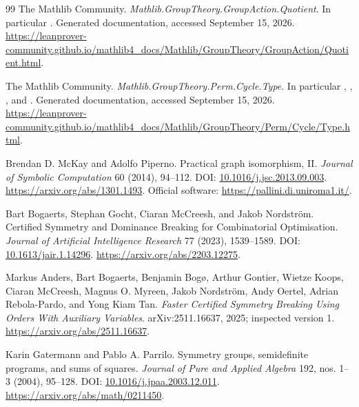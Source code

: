 \begin{thebibliography}{99}
The Mathlib Community.
\emph{Mathlib.GroupTheory.GroupAction.Quotient}.
In particular .
Generated documentation, accessed September 15, 2026.
\url{https://leanprover-community.github.io/mathlib4_docs/Mathlib/GroupTheory/GroupAction/Quotient.html}.

The Mathlib Community.
\emph{Mathlib.GroupTheory.Perm.Cycle.Type}.
In particular , , , and .
Generated documentation, accessed September 15, 2026.
\url{https://leanprover-community.github.io/mathlib4_docs/Mathlib/GroupTheory/Perm/Cycle/Type.html}.

Brendan D. McKay and Adolfo Piperno.
Practical graph isomorphism, II.
\emph{Journal of Symbolic Computation} 60 (2014), 94--112.
DOI: \href{https://doi.org/10.1016/j.jsc.2013.09.003}{10.1016/j.jsc.2013.09.003}.
\url{https://arxiv.org/abs/1301.1493}.
Official software: \url{https://pallini.di.uniroma1.it/}.

Bart Bogaerts, Stephan Gocht, Ciaran McCreesh, and Jakob Nordstr\"om.
Certified Symmetry and Dominance Breaking for Combinatorial Optimisation.
\emph{Journal of Artificial Intelligence Research} 77 (2023), 1539--1589.
DOI: \href{https://doi.org/10.1613/jair.1.14296}{10.1613/jair.1.14296}.
\url{https://arxiv.org/abs/2203.12275}.

Markus Anders, Bart Bogaerts, Benjamin Bog\o, Arthur Gontier, Wietze Koops,
Ciaran McCreesh, Magnus O. Myreen, Jakob Nordstr\"om, Andy Oertel,
Adrian Rebola-Pardo, and Yong Kiam Tan.
\emph{Faster Certified Symmetry Breaking Using Orders With Auxiliary Variables}.
arXiv:2511.16637, 2025; inspected version 1.
\url{https://arxiv.org/abs/2511.16637}.

Karin Gatermann and Pablo A. Parrilo.
Symmetry groups, semidefinite programs, and sums of squares.
\emph{Journal of Pure and Applied Algebra} 192, nos. 1--3 (2004), 95--128.
DOI: \href{https://doi.org/10.1016/j.jpaa.2003.12.011}{10.1016/j.jpaa.2003.12.011}.
\url{https://arxiv.org/abs/math/0211450}.
\end{thebibliography}
